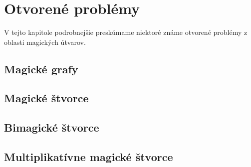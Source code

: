 \chapter{Otvorené problémy}

\label{kap: openproblems} %

V tejto kapitole podrobnejšie preskúmame niektoré známe otvorené problémy z oblasti magických útvarov.

\section{Magické grafy}

\section{Magické štvorce}

\section{Bimagické štvorce}

\section{Multiplikatívne magické štvorce}


